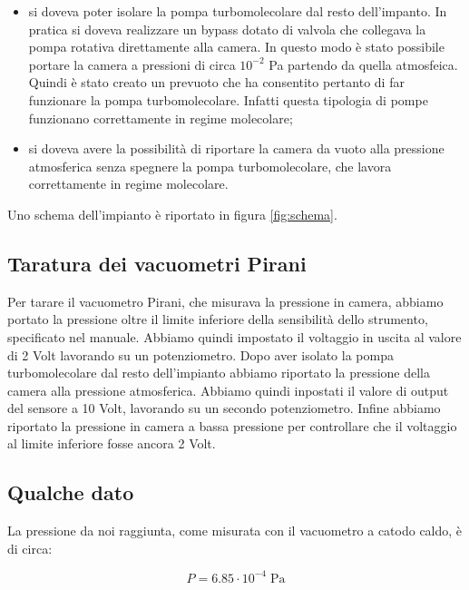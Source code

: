 \begin{itemize}
	\item{si doveva poter isolare la pompa turbomolecolare dal resto dell'impanto. In pratica si doveva realizzare un bypass dotato di valvola che collegava la pompa rotativa direttamente alla camera. In questo modo è stato possibile portare la camera a pressioni di circa $10^{-2}$ \si{\pascal} partendo da quella atmosfeica. Quindi è stato creato un prevuoto che ha consentito pertanto di far funzionare la pompa turbomolecolare. Infatti questa tipologia di pompe funzionano correttamente in regime molecolare;} %
	\item{si doveva avere la possibilità di riportare la camera da vuoto alla pressione atmosferica senza spegnere
    la pompa turbomolecolare, che lavora correttamente in regime molecolare.}
\end{itemize}

Uno schema dell'impianto è riportato in figura \ref{fig:schema}.

\subsection{Taratura dei vacuometri Pirani}

Per tarare il vacuometro Pirani, che misurava la pressione in camera, abbiamo portato la pressione oltre il limite inferiore
della sensibilità dello strumento, specificato nel manuale. Abbiamo quindi impostato il voltaggio in uscita al valore di 2 Volt lavorando su un potenziometro. Dopo aver isolato la pompa turbomolecolare dal resto dell'impianto abbiamo riportato la pressione della camera alla pressione atmosferica. Abbiamo quindi inpostati il valore di output del sensore a 10 Volt, lavorando su un secondo potenziometro. Infine abbiamo riportato la pressione in camera a bassa pressione per controllare che il voltaggio al limite inferiore fosse ancora 2 Volt.

\subsection{Qualche dato}

La pressione da noi raggiunta, come misurata con il vacuometro a catodo caldo, è di circa:

\begin{equation}
    P = 6.85 \cdot 10^{-4} \; \si{\pascal}
\end{equation}

